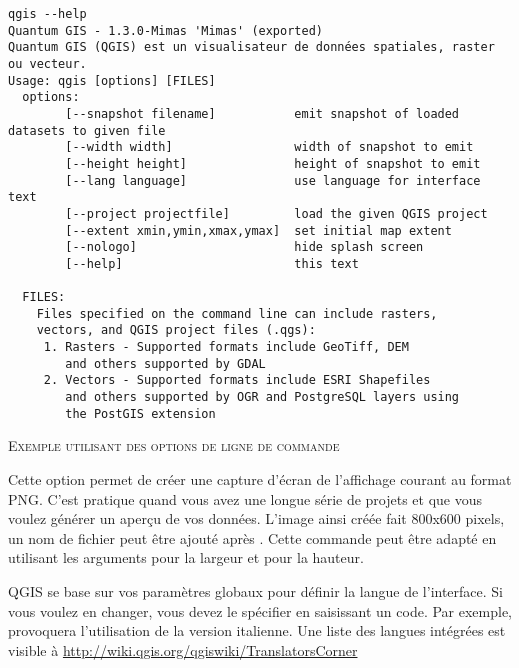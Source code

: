 \small
\begin{verbatim}
qgis --help
Quantum GIS - 1.3.0-Mimas 'Mimas' (exported)
Quantum GIS (QGIS) est un visualisateur de données spatiales, raster ou vecteur.
Usage: qgis [options] [FILES]
  options:
		[--snapshot filename]           emit snapshot of loaded datasets to given file
		[--width width]                 width of snapshot to emit
		[--height height]               height of snapshot to emit
		[--lang language]               use language for interface text
		[--project projectfile]         load the given QGIS project
		[--extent xmin,ymin,xmax,ymax]  set initial map extent
		[--nologo]                      hide splash screen
		[--help]                        this text

  FILES:
    Files specified on the command line can include rasters,
    vectors, and QGIS project files (.qgs):
     1. Rasters - Supported formats include GeoTiff, DEM
        and others supported by GDAL
     2. Vectors - Supported formats include ESRI Shapefiles
        and others supported by OGR and PostgreSQL layers using
        the PostGIS extension
\end{verbatim}
\normalsize

\begin{Astuce} \caption{\textsc{Exemple utilisant des options de ligne de commande}}
\end{Astuce}

Cette option permet de créer une capture d'écran de l'affichage courant au format PNG. C'est pratique quand vous avez une longue série de projets et que vous voulez générer un aperçu de vos données. L'image ainsi créée fait 800x600 pixels, un nom de fichier peut être ajouté après . Cette commande peut être adapté en utilisant les arguments  pour la largeur et  pour la hauteur.

QGIS se base sur vos paramètres globaux pour définir la langue de l'interface. Si vous voulez en changer, vous devez le spécifier en saisissant un code. 
Par exemple,  provoquera l'utilisation de la version italienne. Une liste des langues intégrées est visible à \url{http://wiki.qgis.org/qgiswiki/TranslatorsCorner}

